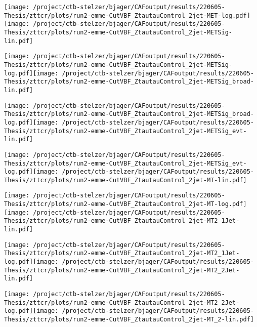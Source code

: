 \documentclass{article}
\begin{document}
\texttt{[image: /project/ctb-stelzer/bjager/CAFoutput/results/220605-Thesis/zttcr/plots/run2-emme-CutVBF\_ZtautauControl\_2jet-MET-log.pdf]}\texttt{[image: /project/ctb-stelzer/bjager/CAFoutput/results/220605-Thesis/zttcr/plots/run2-emme-CutVBF\_ZtautauControl\_2jet-METSig-lin.pdf]}

\texttt{[image: /project/ctb-stelzer/bjager/CAFoutput/results/220605-Thesis/zttcr/plots/run2-emme-CutVBF\_ZtautauControl\_2jet-METSig-log.pdf]}\texttt{[image: /project/ctb-stelzer/bjager/CAFoutput/results/220605-Thesis/zttcr/plots/run2-emme-CutVBF\_ZtautauControl\_2jet-METSig\_broad-lin.pdf]}

\texttt{[image: /project/ctb-stelzer/bjager/CAFoutput/results/220605-Thesis/zttcr/plots/run2-emme-CutVBF\_ZtautauControl\_2jet-METSig\_broad-log.pdf]}\texttt{[image: /project/ctb-stelzer/bjager/CAFoutput/results/220605-Thesis/zttcr/plots/run2-emme-CutVBF\_ZtautauControl\_2jet-METSig\_evt-lin.pdf]}

\texttt{[image: /project/ctb-stelzer/bjager/CAFoutput/results/220605-Thesis/zttcr/plots/run2-emme-CutVBF\_ZtautauControl\_2jet-METSig\_evt-log.pdf]}\texttt{[image: /project/ctb-stelzer/bjager/CAFoutput/results/220605-Thesis/zttcr/plots/run2-emme-CutVBF\_ZtautauControl\_2jet-MT-lin.pdf]}

\texttt{[image: /project/ctb-stelzer/bjager/CAFoutput/results/220605-Thesis/zttcr/plots/run2-emme-CutVBF\_ZtautauControl\_2jet-MT-log.pdf]}\texttt{[image: /project/ctb-stelzer/bjager/CAFoutput/results/220605-Thesis/zttcr/plots/run2-emme-CutVBF\_ZtautauControl\_2jet-MT2\_1Jet-lin.pdf]}

\texttt{[image: /project/ctb-stelzer/bjager/CAFoutput/results/220605-Thesis/zttcr/plots/run2-emme-CutVBF\_ZtautauControl\_2jet-MT2\_1Jet-log.pdf]}\texttt{[image: /project/ctb-stelzer/bjager/CAFoutput/results/220605-Thesis/zttcr/plots/run2-emme-CutVBF\_ZtautauControl\_2jet-MT2\_2Jet-lin.pdf]}

\texttt{[image: /project/ctb-stelzer/bjager/CAFoutput/results/220605-Thesis/zttcr/plots/run2-emme-CutVBF\_ZtautauControl\_2jet-MT2\_2Jet-log.pdf]}\texttt{[image: /project/ctb-stelzer/bjager/CAFoutput/results/220605-Thesis/zttcr/plots/run2-emme-CutVBF\_ZtautauControl\_2jet-MT\_2-lin.pdf]}
\end{document}
